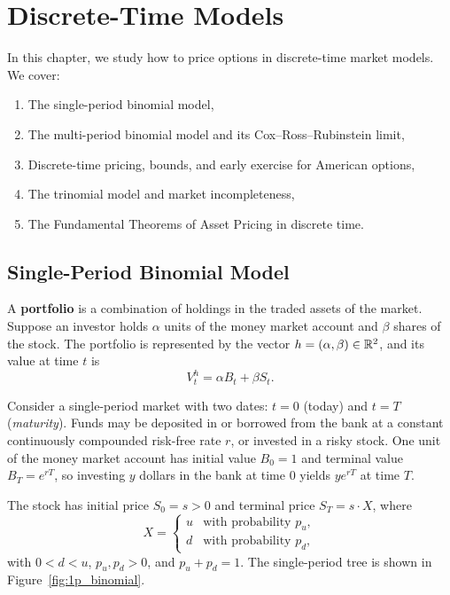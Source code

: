 \chapter{Discrete-Time Models}
\label{ch:discrete_time_models}

In this chapter, we study how to price options in discrete-time market models. We cover:
\begin{enumerate}
    \item The single-period binomial model,
    \item The multi-period binomial model and its Cox--Ross--Rubinstein limit,
    \item Discrete-time pricing, bounds, and early exercise for American options,
    \item The trinomial model and market incompleteness,
    \item The Fundamental Theorems of Asset Pricing in discrete time.
\end{enumerate}

\section{Single-Period Binomial Model}

\begin{definition}
\label{def:portfolio}
A \textbf{portfolio} is a combination of holdings in the traded assets of the market. Suppose an investor holds $\alpha$ units of the money market account and $\beta$ shares of the stock. The portfolio is represented by the vector $h = (\alpha, \beta) \in \mathbb{R}^2$, and its value at time $t$ is
\[
    V_t^h = \alpha B_t + \beta S_t.
\]
\end{definition}

Consider a single-period market with two dates: $t = 0$ (today) and $t = T$ (\emph{maturity}). Funds may be deposited in or borrowed from the bank at a constant continuously compounded risk-free rate $r$, or invested in a risky stock. One unit of the money market account has initial value $B_0 = 1$ and terminal value $B_T = e^{rT}$, so investing $y$ dollars in the bank at time $0$ yields $y e^{rT}$ at time $T$.

The stock has initial price $S_0 = s > 0$ and terminal price $S_T = s \cdot X$, where
\[
    X =
    \begin{cases}
        u & \text{with probability } p_u, \\
        d & \text{with probability } p_d,
    \end{cases}
\]
with $0 < d < u$, $p_u, p_d > 0$, and $p_u + p_d = 1$. The single-period tree is shown in Figure~\ref{fig:1p_binomial}.


